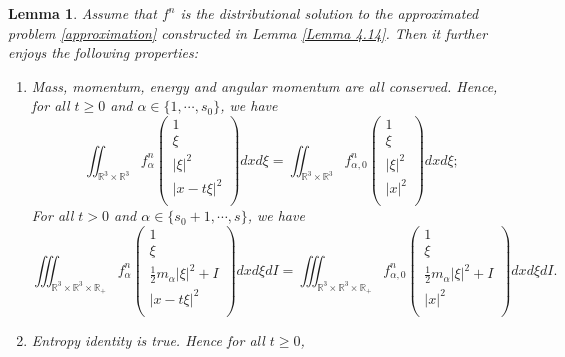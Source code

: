 \documentclass[10pt,a4paper]{amsart}
\newtheorem{lemma}{Lemma}
\def\R{\mathbb{R}}
\begin{document}
\begin{lemma}\label{Lemma 4.17}
Assume that $f^n$ is the distributional solution to the approximated problem \eqref{approximation} constructed in Lemma \ref{Lemma 4.14}. Then it further enjoys the following properties:
\begin{enumerate}
	\item {Mass, momentum, energy and angular momentum are all conserved. Hence, for all $t \geq 0$ and $\alpha \in \{1,\cdots,s_0\}$, we have
		\begin{equation*}
			\iint_{\R^3 \times \R^3 } f^n_\alpha 
			\left (\begin{array}{c}
				1 \\[2mm]
				\xi \\ [2mm]
				|\xi|^2 \\ [2mm]
				|x-t\xi|^2 \\[2mm]
			\end{array}\right ) dxd\xi 
			= \iint_{\R^3 \times \R^3 } f_{\alpha ,0}^n 
			\left (\begin{array}{c}
				1 \\[2mm]
				\xi \\ [2mm]
				|\xi|^2 \\ [2mm]
				|x|^2 \\[2mm]
			\end{array}\right )dxd\xi ;
	\end{equation*}
For all $t>0$ and $\alpha \in \{s_0+1,\cdots,s\}$, we have
\begin{equation*}
	\iiint_{\R^3 \times \R^3 \times \R_+ } f^n_\alpha 
	\left (\begin{array}{c}
		1 \\[2mm]
		\xi \\ [2mm]
		\frac{1}{2}m_\alpha|\xi|^2+I \\ [2mm]
		|x-t\xi|^2 \\[2mm]
	\end{array}\right ) dxd\xi dI 
	= \iiint_{\R^3 \times \R^3 \times \R_+ } f_{\alpha ,0}^n 
	\left (\begin{array}{c}
		1 \\[2mm]
		\xi \\ [2mm]
		\frac{1}{2}m_\alpha|\xi|^2+I\\ [2mm]
		|x|^2 \\[2mm]
	\end{array}\right )dxd\xi dI .
	\end{equation*}}\label{1 of Lemma 4.17}
	\item{Entropy identity is true. Hence for all $t \geq 0$,
}
\end{enumerate}
\end{lemma}
\end{document}
